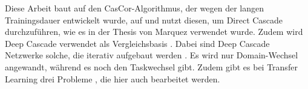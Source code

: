 Diese Arbeit baut auf den CasCor-Algorithmus\cite{cascor}, der wegen der langen Trainingsdauer entwickelt wurde, auf und nutzt diesen, 
um Direct Cascade \cite{cascade_network_architectures} 
durchzuführen, wie es in der Thesis von Marquez \cite{phd_deep_cascade} verwendet wurde. Zudem wird Deep Cascade verwendet als 
Vergleichsbasis \cite{deep_cascade_learning}. Dabei sind Deep Cascade Netzwerke solche, die iterativ aufgebaut werden \cite{Constructive_Cascade}. 
Es wird nur Domain-Wechsel angewandt, während es noch den Taskwechsel \cite{transfer_learning} gibt. Zudem gibt es bei Transfer Learning drei 
Probleme \cite{survey_transfer}, die hier auch bearbeitet werden. 







